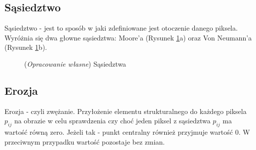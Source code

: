 \documentclass{article}
\begin{document}
        \newpage
        \subsection{Sąsiedztwo}
        {
            \label{sec:sasiedztwo}
            \Large
            \justifying
            \quad
            Sąsiedztwo - jest to sposób w jaki zdefiniowane jest otoczenie danego piksela.
            Wyróżnia się dwa głowne sąsiedztwa: Moore'a (Rysunek \ref{neighbourhood}a) oraz Von Neumann'a (Rysunek \ref{neighbourhood}b).
        }
        \begin{figure}[H]
            \centering
            \qquad
            \caption{(\textit{Opracowanie własne}) Sąsiedztwa}
            \label{neighbourhood}
        \end{figure}

        \subsection{Erozja}
        {
            \label{sec:erozja}
            \Large
            \justifying
            \quad
            Erozja - czyli zwężanie.
            Przyłożenie elementu strukturalnego do każdego piksela \(p_{ij}\) na obrazie w celu sprawdzenia czy choć jeden piksel z sąsiedztwa \(p_{ij}\) ma wartość równą zero.
            Jeżeli tak - punkt centralny również przyjmuje wartość 0. W przeciwnym przypadku wartość pozostaje bez zmian.
        }
\end{document}
